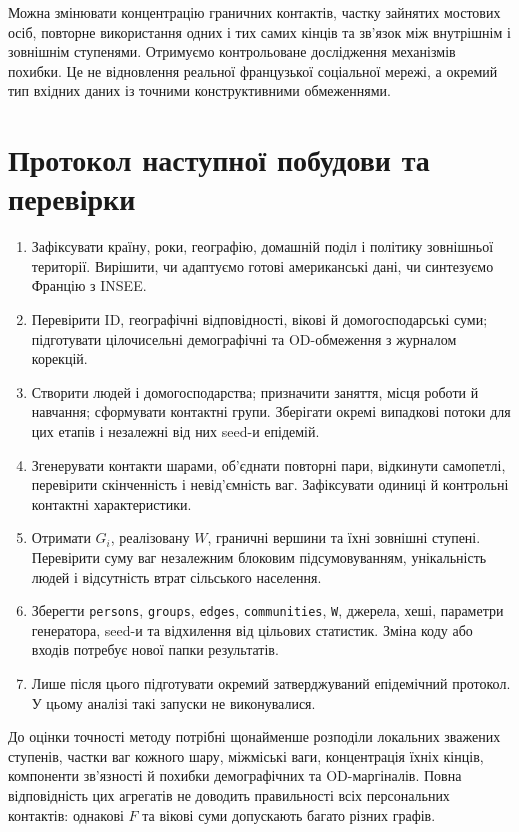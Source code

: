\documentclass[11pt,a4paper]{article}
\begin{document}
Можна змінювати концентрацію граничних контактів, частку зайнятих мостових осіб, повторне використання одних і тих самих кінців та зв'язок між внутрішнім і зовнішнім ступенями. Отримуємо контрольоване дослідження механізмів похибки. Це не відновлення реальної французької соціальної мережі, а окремий тип вхідних даних із точними конструктивними обмеженнями.

\section{Протокол наступної побудови та перевірки}
\begin{enumerate}
\item Зафіксувати країну, роки, географію, домашній поділ і політику зовнішньої території. Вирішити, чи адаптуємо готові американські дані, чи синтезуємо Францію з INSEE.
\item Перевірити ID, географічні відповідності, вікові й домогосподарські суми; підготувати цілочисельні демографічні та OD-обмеження з журналом корекцій.
\item Створити людей і домогосподарства; призначити заняття, місця роботи й навчання; сформувати контактні групи. Зберігати окремі випадкові потоки для цих етапів і незалежні від них seed-и епідемій.
\item Згенерувати контакти шарами, об'єднати повторні пари, відкинути самопетлі, перевірити скінченність і невід'ємність ваг. Зафіксувати одиниці й контрольні контактні характеристики.
\item Отримати $G_i$, реалізовану $W$, граничні вершини та їхні зовнішні ступені. Перевірити суму ваг незалежним блоковим підсумовуванням, унікальність людей і відсутність втрат сільського населення.
\item Зберегти \texttt{persons}, \texttt{groups}, \texttt{edges}, \texttt{communities}, \texttt{W}, джерела, хеші, параметри генератора, seed-и та відхилення від цільових статистик. Зміна коду або входів потребує нової папки результатів.
\item Лише після цього підготувати окремий затверджуваний епідемічний протокол. У цьому аналізі такі запуски не виконувалися.
\end{enumerate}

До оцінки точності методу потрібні щонайменше розподіли локальних зважених ступенів, частки ваг кожного шару, міжміські ваги, концентрація їхніх кінців, компоненти зв'язності й похибки демографічних та OD-маргіналів. Повна відповідність цих агрегатів не доводить правильності всіх персональних контактів: однакові $F$ та вікові суми допускають багато різних графів.
\end{document}
